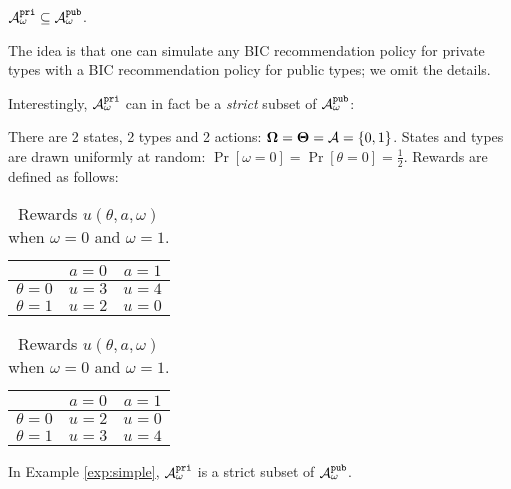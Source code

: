 
\begin{claim}
$\mathcal{A}_{\omega}^{\mathtt{pri}} \subseteq \mathcal{A}_{\omega}^{\mathtt{pub}}$.
\end{claim}

The idea is that one can simulate any BIC recommendation policy for private types with a BIC recommendation policy for public types; we omit the details.


Interestingly, $\mathcal{A}_{\omega}^{\mathtt{pri}}$ can in fact be a {\em strict} subset of $\mathcal{A}_{\omega}^{\mathtt{pub}}$:

\begin{example}
	\label{exp:simple}
	There are 2 states, 2 types and 2 actions:
	$\bold{\Omega} = \bold{\Theta} = \mathcal{A} = \{0,1\}$.
	States and types are drawn uniformly at random:
	$\Pr[\omega =0] =\Pr[\theta =0] = \tfrac12$.
	Rewards are defined as follows:\\
	\begin{table}[H]
		\centering
		\begin{tabular}{|c||c|c|}
			\hline
			&$a=0$&$a=1$\\
			\hline
			\hline
			$\theta = 0$& $u = 3$ & $u =4$\\
			\hline
			$\theta = 1$& $u = 2$ & $u =0$\\
			\hline
		\end{tabular}
		\quad
		\begin{tabular}{|c||c|c|}
			\hline
			&$a=0$&$a=1$\\
			\hline
			\hline
			$\theta = 0$& $u = 2$ & $u =0$\\
			\hline
			$\theta = 1$& $u = 3$ & $u =4$\\
			\hline
		\end{tabular}
		\caption{Rewards $u(\theta,a,\omega)$ when $\omega =0 $ and $\omega = 1$.}
	\end{table}
\end{example}

\begin{claim}
	In Example \ref{exp:simple}, $\mathcal{A}_{\omega}^{\mathtt{pri}}$ is a strict subset of $\mathcal{A}_{\omega}^{\mathtt{pub}}$.
\end{claim}

